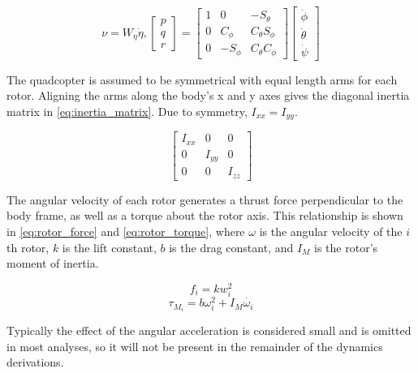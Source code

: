 \documentclass[letterpaper,12pt,titlepage,oneside,final]{book}
\begin{document}
\begin{equation} \label{eq:local_angular_velocity}
\nu = W_{\eta}\dot{\eta},
\begin{bmatrix}
p \\
q \\
r
\end{bmatrix}
=
\begin{bmatrix}
1 & 0 & -S_{\theta} \\
0 & C_{\phi} & C_{\theta}S_{\phi} \\
0 & -S_{\phi} & C_{\theta}C_{\phi}
\end{bmatrix}
\begin{bmatrix}
\dot{\phi} \\
\dot{\theta} \\
\dot{\psi}
\end{bmatrix}
\end{equation}

The quadcopter is assumed to be symmetrical with equal length arms for each rotor. 
Aligning the arms along the body's x and y axes gives the diagonal inertia matrix in \eqref{eq:inertia_matrix}. 
Due to symmetry, $I_{xx} = I_{yy}$.

\begin{equation} \label{eq:inertia_matrix}
\begin{bmatrix}
I_{xx} & 0 & 0 \\
0 & I_{yy} & 0 \\
0 & 0 & I_{zz}
\end{bmatrix}
\end{equation}

The angular velocity of each rotor generates a thrust force perpendicular to the body frame, as well as a torque about the rotor axis. 
This relationship is shown in \eqref{eq:rotor_force} and \eqref{eq:rotor_torque}, 
where $\omega$ is the angular velocity of the $i$th rotor, $k$ is the lift constant, $b$ is the drag constant, and $I_{M}$ is the rotor's moment of inertia.

\begin{equation} \label{eq:rotor_force}
f_{i} = kw_{i}^{2}
\end{equation}
\begin{equation} \label{eq:rotor_torque}
\tau_{M_{i}} = b\omega_{i}^{2} + I_{M}\dot{\omega_{i}}
\end{equation}

Typically the effect of the angular acceleration is considered small and is omitted in most analyses, so it will not be present in the remainder of the dynamics derivations.
\end{document}
